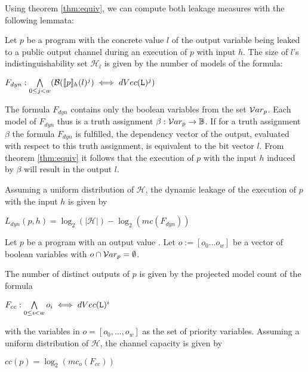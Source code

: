 Using theorem \ref{thm:equiv}, we can compute both leakage measures with the following lemmata:

\begin{lemma}
    Let $p$ be a program with the concrete value $l$ of the output variable \Out being leaked to a public output channel during an execution of $p$ with input $h$.
    The size of $l$'s indistinguishability set $\mathcal{H}_l$ is given by the number of models of the formula:
    \begin{center}
        $F_{dyn} : \bigwedge\limits_{0 \leq j < w} (\mathcal{B}(\llbracket p \rrbracket_h(l)^j) \iff dVec(\mathtt{L})^j)$
    \end{center}
\end{lemma}

The formula $F_{dyn}$ contains only the boolean variables from the set $\mathcal{V}ar_p$. Each model of $F_{dyn}$ thus is a truth assignment $\beta: \mathcal{V}ar_p \to \mathbb{B}$.
If for a truth assignment $\beta$ the formula $F_{dyn}$ is fulfilled, the dependency vector of the output, evaluated with respect to this truth assignment, is equivalent to the bit vector $l$. From theorem \ref{thm:equiv} it follows that the execution of $p$ with the input $h$ induced by $\beta$ will result in the output $l$.

Assuming a uniform distribution of $\mathcal{H}$, the dynamic leakage of the execution of $p$ with the input $h$ is given by
    \begin{center}
        $L_{dyn}(p, h) = \log_2(|\mathcal{H}|) - \log_2(mc(F_{dyn}))$
    \end{center}

\begin{lemma}
    Let $p$ be a program with an output value \Out. Let $o := [o_0 ... o_w]$ be a vector of boolean variables with $o \cap \mathcal{V}ar_p = \emptyset$.
    
    The number of distinct outputs of $p$ is given by the projected model count of the formula
    \begin{center}
        $F_{cc} : \bigwedge\limits_{0 \leq i < w} o_i \iff dVec(\mathtt{L})^i$
    \end{center}
    with the variables in $o = [o_0, ..., o_w]$ as the set of priority variables.
    Assuming a uniform distribution of $\mathcal{H}$, the channel capacity is given by
    \begin{center}
        $cc(p) = \log_2(mc_o(F_{cc}))$
    \end{center}
\end{lemma}

